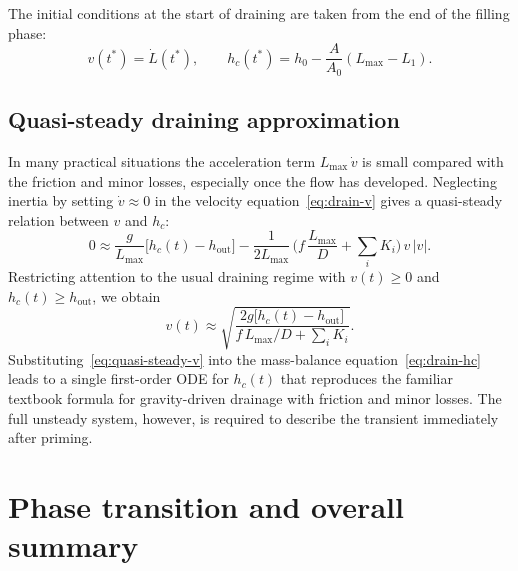 \documentclass[11pt]{article}
\begin{document}
The initial conditions at the start of draining are taken from the end of the filling phase:
\[
  v(t^*) = \dot L(t^*),\qquad
  h_c(t^*) = h_0 - \frac{A}{A_0}(L_{\max} - L_1).
\]

\subsection{Quasi-steady draining approximation}

In many practical situations the acceleration term $L_{\max}\,\dot v$ is small compared with the
friction and minor losses, especially once the flow has developed. Neglecting inertia by
setting $\dot v \approx 0$ in the velocity equation~\eqref{eq:drain-v} gives a quasi-steady relation between $v$
and $h_c$:
\[
  0 \approx \frac{g}{L_{\max}}\bigl[h_c(t) - h_{\text{out}}\bigr]
            - \frac{1}{2L_{\max}}\,\Big(f\,\frac{L_{\max}}{D} + \sum_i K_i\Big)\,v\,|v|.
\]
Restricting attention to the usual draining regime with $v(t) \ge 0$ and $h_c(t) \ge h_{\text{out}}$,
we obtain
\begin{equation}
  v(t) \approx
  \sqrt{\frac{2g\bigl[h_c(t) - h_{\text{out}}\bigr]}
             {f\,L_{\max}/D + \sum_i K_i}}.
  \label{eq:quasi-steady-v}
\end{equation}
Substituting~\eqref{eq:quasi-steady-v} into the mass-balance equation~\eqref{eq:drain-hc} leads to a single first-order ODE for
$h_c(t)$ that reproduces the familiar textbook formula for gravity-driven drainage with
friction and minor losses. The full unsteady system, however, is required to describe the
transient immediately after priming.

\section{Phase transition and overall summary}
\end{document}

